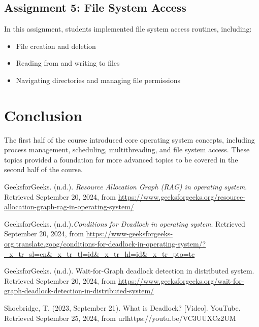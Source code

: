 \documentclass[12pt]{article}
\begin{document}
\subsection{Assignment 5: File System Access}
In this assignment, students implemented file system access routines, including:
\begin{itemize}
    \item File creation and deletion
    \item Reading from and writing to files
    \item Navigating directories and managing file permissions
\end{itemize}

\section{Conclusion}
The first half of the course introduced core operating system concepts, including process management, scheduling, multithreading, and file system access. These topics provided a foundation for more advanced topics to be covered in the second half of the course.

\begin{thebibliography}{9}
    GeeksforGeeks. (n.d.). \textit{Resource Allocation Graph (RAG) in operating system}. Retrieved September 20, 2024, from \url{https://www.geeksforgeeks.org/resource-allocation-graph-rag-in-operating-system/}

    GeeksforGeeks. (n.d.).\textit{Conditions for Deadlock in operating system}. Retrieved September 20, 2024, from \url{https://www-geeksforgeeks-org.translate.goog/conditions-for-deadlock-in-operating-system/?_x_tr_sl=en&_x_tr_tl=id&_x_tr_hl=id&_x_tr_pto=tc}

    GeeksforGeeks. (n.d.). Wait-for-Graph deadlock detection in distributed system. Retrieved September 20, 2024, from \url{https://www.geeksforgeeks.org/wait-for-graph-deadlock-detection-in-distributed-system/}

    \bibitem{}
    Shoebridge, T. (2023, September 21). What is Deadlock? [Video]. YouTube. Retrieved September 25, 2024, from url{https://youtu.be/VC3UUXCz2UM}

    
\end{thebibliography}

    
\end{document}
